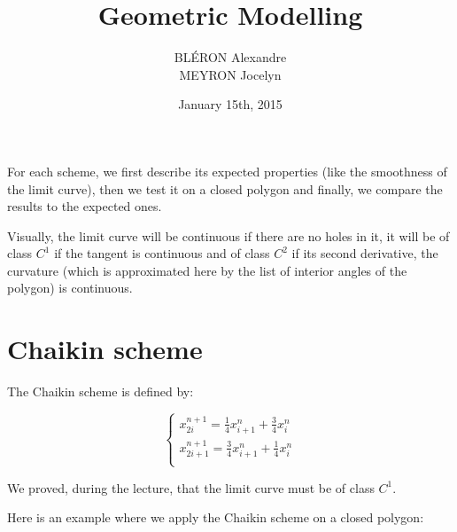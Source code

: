 \documentclass[a4paper,11pt]{article}
\title{Geometric Modelling}
\author{BLÉRON Alexandre\\MEYRON Jocelyn}
\date{January 15th, 2015}
\begin{document}
\maketitle

For each scheme, we first describe its expected properties (like the smoothness
of the limit curve), then we test it on a closed polygon and finally, we compare
the results to the expected ones.

Visually, the limit curve will be continuous if there are no holes in it, it
will be of class $ C^1 $ if the tangent is continuous and of class $ C^2 $ if
its second derivative, the curvature (which is approximated here by the list of
interior angles of the polygon) is continuous.

\section{Chaikin scheme}

The Chaikin scheme is defined by:

$$
    \begin{cases}
        x_{2i}^{n+1} = \frac{1}{4} x_{i+1}^n + \frac{3}{4} x_{i}^n \\
        x_{2i + 1}^{n+1} = \frac{3}{4} x_{i+1}^n + \frac{1}{4} x_{i}^n \\
    \end{cases}
$$

We proved, during the lecture, that the limit curve must be of class $ C^1 $.

Here is an example where we apply the Chaikin scheme on a closed polygon:
\end{document}
